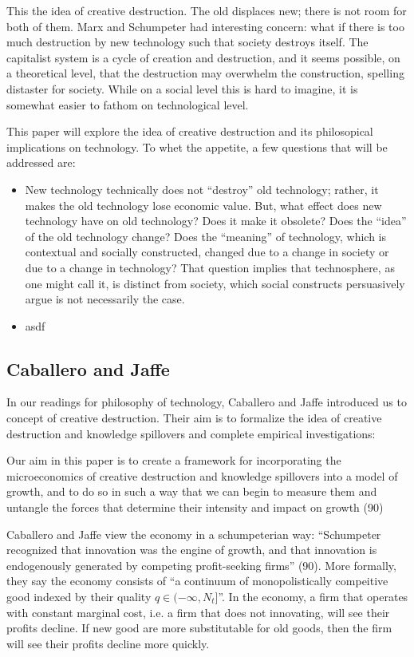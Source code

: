 \documentclass[11pt]{article}
\begin{document}
This the idea of creative destruction.
The old displaces new; there is not room for both of them.
Marx and Schumpeter had interesting concern: what if there is too much destruction by new technology such that society destroys itself.
The capitalist system is a cycle of creation and destruction, and it seems possible, on a theoretical level, that the destruction may overwhelm the construction, spelling distaster for society.
While on a social level this is hard to imagine, it is somewhat easier to fathom on technological level.

This paper will explore the idea of creative destruction and its philosopical implications on technology. 
To whet the appetite, a few questions that will be addressed are:
\begin{itemize}
    \item New technology technically does not ``destroy'' old technology; rather, it makes the old technology lose economic value. But, what effect does new technology have on old technology? Does it make it obsolete? Does the ``idea'' of the old technology change? Does the ``meaning'' of technology, which is contextual and socially constructed, changed due to a change in society or due to a change in technology? That question implies that technosphere, as one might call it, is distinct from society, which social constructs persuasively argue is not necessarily the case.
    \item asdf
\end{itemize}

\subsection{Caballero and Jaffe}
In our readings for philosophy of technology, Caballero and Jaffe introduced us to concept of creative destruction.
Their aim is to formalize the idea of creative destruction and knowledge spillovers and complete empirical investigations:
\begin{displayquote}
    Our aim in this paper is to create a framework for incorporating the microeconomics of creative destruction and knowledge spillovers into a model of growth, and to do so in such a way that we can begin to measure them and untangle the forces that determine their intensity and impact on growth (90)
\end{displayquote}

Caballero and Jaffe view the economy in a schumpeterian way: ``Schumpeter recognized that innovation was the engine of growth, and that innovation is endogenously generated by competing profit-seeking firms'' (90). 
More formally, they say the economy consists of ``a continuum of monopolistically compeitive good indexed by their quality $q \in (-\infty, N_t]$''.
In the economy, a firm that operates with constant marginal cost, i.e. a firm that does not innovating, will see their profits decline. 
If new good are more substitutable for old goods, then the firm will see their profits decline more quickly.
\end{document}
